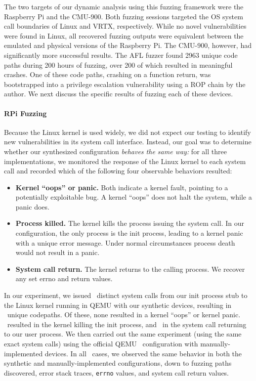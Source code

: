 The two targets of our dynamic analysis using this fuzzing framework were the Raspberry Pi and the CMU-900.
Both fuzzing sessions targeted the OS system call boundaries of Linux and VRTX, respectively.
While no novel vulnerabilities were found in Linux, all recovered fuzzing outputs were equivalent between the emulated and physical versions of the Raspberry Pi.
The CMU-900, however, had significantly more successful results.
The AFL fuzzer found 2963 unique code paths during 200 hours of fuzzing, over 200 of which resulted in meaningful crashes.
One of these code paths, crashing on a function return, was bootstrapped into a privilege escalation vulnerability using a ROP chain by the author.
We next discuss the specific results of fuzzing each of these devices.

\paragraph{RPi Fuzzing}

Because the Linux kernel is used widely, we did not expect our testing to identify new vulnerabilities in its system call interface. Instead, our goal was to determine whether our synthesized configuration \emph{behaves the same way:} for all three implementations, we monitored the response of the Linux kernel to each system call and recorded which of the following four observable behaviors resulted:

\begin{itemize}[itemsep=0pt, leftmargin=18pt]
\item \textbf{Kernel ``oops'' or panic.} Both indicate a kernel fault, pointing to a potentially exploitable bug. A kernel ``oops'' does not halt the system, while a panic does.
\item \textbf{Process killed.} The kernel kills the process issuing the system call. In our configuration, the only process is the init process, leading to a kernel panic with a unique error message. Under normal circumstances process death would not result in a panic.
\item \textbf{System call return.} The kernel returns to the calling process. We recover any set errno and return values.
\end{itemize}

In our experiment, we issued \rpiDistinctSyscalls\ distinct system calls from our init process stub to the Linux kernel running in QEMU with our synthetic devices, resulting in \rpiNumPathsDiscovered\ unique codepaths. Of these, none resulted in a kernel ``oops'' or kernel panic. \rpiNumDeaths\ resulted in the kernel killing the init process, and \rpiNumReturns\ in the system call returning to our user process. 
We then carried out the same experiment (using the same exact system calls) using the official QEMU \rpitwo\ configuration with manually-implemented devices.
In all \rpiNumPathsDiscovered\ cases, we observed the same behavior in both the synthetic and manually-implemented configurations, down to fuzzing paths discovered, error stack traces, \texttt{errno} values, and system call return values.

